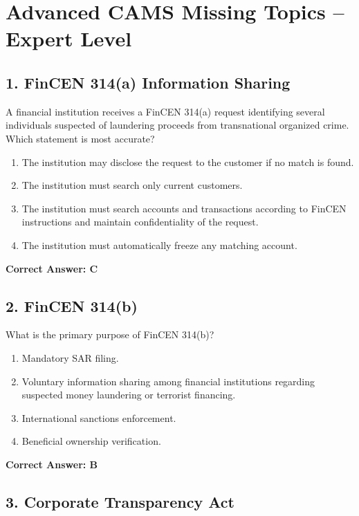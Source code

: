 \documentclass[11pt,a4paper]{article}
\begin{document}
	
	\section{Advanced CAMS Missing Topics – Expert Level}
	
	\subsection{1. FinCEN 314(a) Information Sharing}
	
	A financial institution receives a FinCEN 314(a) request identifying several individuals suspected of laundering proceeds from transnational organized crime. Which statement is most accurate?
	
	\begin{enumerate}[label=\Alph*.]
		\item The institution may disclose the request to the customer if no match is found.
		\item The institution must search only current customers.
		\item The institution must search accounts and transactions according to FinCEN instructions and maintain confidentiality of the request.
		\item The institution must automatically freeze any matching account.
	\end{enumerate}
	
	\textbf{Correct Answer: C}
	
	\subsection{2. FinCEN 314(b)}
	
	What is the primary purpose of FinCEN 314(b)?
	
	\begin{enumerate}[label=\Alph*.]
		\item Mandatory SAR filing.
		\item Voluntary information sharing among financial institutions regarding suspected money laundering or terrorist financing.
		\item International sanctions enforcement.
		\item Beneficial ownership verification.
	\end{enumerate}
	
	\textbf{Correct Answer: B}
	
	\subsection{3. Corporate Transparency Act}
	
\end{document}
